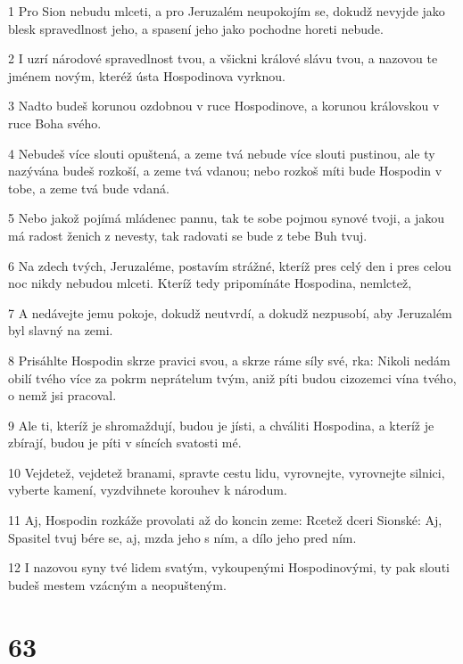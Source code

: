 \par 1 Pro Sion nebudu mlceti, a pro Jeruzalém neupokojím se, dokudž nevyjde jako blesk spravedlnost jeho, a spasení jeho jako pochodne horeti nebude.
\par 2 I uzrí národové spravedlnost tvou, a všickni králové slávu tvou, a nazovou te jménem novým, kteréž ústa Hospodinova vyrknou.
\par 3 Nadto budeš korunou ozdobnou v ruce Hospodinove, a korunou královskou v ruce Boha svého.
\par 4 Nebudeš více slouti opuštená, a zeme tvá nebude více slouti pustinou, ale ty nazývána budeš rozkoší, a zeme tvá vdanou; nebo rozkoš míti bude Hospodin v tobe, a zeme tvá bude vdaná.
\par 5 Nebo jakož pojímá mládenec pannu, tak te sobe pojmou synové tvoji, a jakou má radost ženich z nevesty, tak radovati se bude z tebe Buh tvuj.
\par 6 Na zdech tvých, Jeruzaléme, postavím strážné, kteríž pres celý den i pres celou noc nikdy nebudou mlceti. Kteríž tedy pripomínáte Hospodina, nemlctež,
\par 7 A nedávejte jemu pokoje, dokudž neutvrdí, a dokudž nezpusobí, aby Jeruzalém byl slavný na zemi.
\par 8 Prisáhlte Hospodin skrze pravici svou, a skrze ráme síly své, rka: Nikoli nedám obilí tvého více za pokrm neprátelum tvým, aniž píti budou cizozemci vína tvého, o nemž jsi pracoval.
\par 9 Ale ti, kteríž je shromaždují, budou je jísti, a chváliti Hospodina, a kteríž je zbírají, budou je píti v síncích svatosti mé.
\par 10 Vejdetež, vejdetež branami, spravte cestu lidu, vyrovnejte, vyrovnejte silnici, vyberte kamení, vyzdvihnete korouhev k národum.
\par 11 Aj, Hospodin rozkáže provolati až do koncin zeme: Rcetež dceri Sionské: Aj, Spasitel tvuj bére se, aj, mzda jeho s ním, a dílo jeho pred ním.
\par 12 I nazovou syny tvé lidem svatým, vykoupenými Hospodinovými, ty pak slouti budeš mestem vzácným a neopušteným.

\chapter{63}

